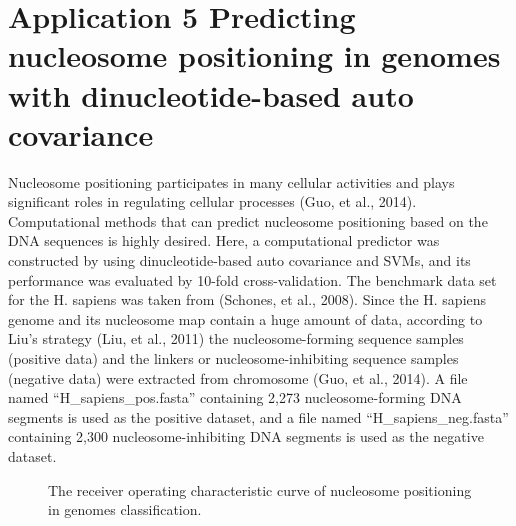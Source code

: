 \documentclass[letterpaper,10pt,english]{sphinxmanual}
\begin{document}
\section{Application 5 Predicting nucleosome positioning in genomes with dinucleotide-based auto covariance}
\label{application:application-5-predicting-nucleosome-positioning-in-genomes-with-dinucleotide-based-auto-covariance}
Nucleosome positioning participates in many cellular activities and plays significant roles in regulating cellular processes (Guo, et al., 2014). Computational methods that can predict nucleosome positioning based on the DNA sequences is highly desired. Here, a computational predictor was constructed by using dinucleotide-based auto covariance and SVMs, and its performance was evaluated by 10-fold cross-validation. The benchmark data set for the H. sapiens was taken from (Schones, et al., 2008). Since the H. sapiens genome and its nucleosome map contain a huge amount of data, according to Liu’s strategy (Liu, et al., 2011) the nucleosome-forming sequence samples (positive data) and the linkers or nucleosome-inhibiting sequence samples (negative data) were extracted from chromosome (Guo, et al., 2014). A file named ``H\_sapiens\_pos.fasta'' containing 2,273 nucleosome-forming DNA segments is used as the positive dataset, and a file named ``H\_sapiens\_neg.fasta'' containing 2,300 nucleosome-inhibiting DNA segments is used as the negative dataset.
\begin{figure}[htbp]
\centering
\capstart

\noindent{}
\caption{The receiver operating characteristic curve of nucleosome positioning in genomes classification.}\label{application:id6}\end{figure}
\end{document}
